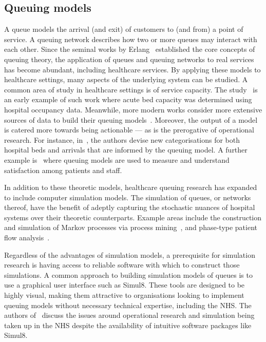 \subsection{Queuing models}\label{subsec:queuing}

A queue models the arrival (and exit) of customers to (and from) a point of
service. A queuing network describes how two or more queues may interact with
each other. Since the seminal works by Erlang~\cite{Erlang1917,Erlang1920}
established the core concepts of queuing theory, the application of queues and
queuing networks to real services has become abundant, including healthcare
services. By applying these models to healthcare settings, many aspects of the
underlying system can be studied. A common area of study in healthcare settings
is of service capacity. The study~\cite{McClain1976} is an early example of such
work where acute bed capacity was determined using hospital occupancy data.
Meanwhile, more modern works consider more extensive sources of data to build
their queuing models~\cite{Palvannan2012,Pinto2014,Williams2015}. Moreover, the
output of a model is catered more towards being actionable --- as is the
prerogative of operational research. For instance, in~\cite{Pinto2014}, the
authors devise new categorisations for both hospital beds and arrivals that are
informed by the queuing model. A further example is~\cite{Komashie2015} where
queuing models are used to measure and understand satisfaction among patients
and staff.

In addition to these theoretic models, healthcare queuing research has expanded
to include computer simulation models. The simulation of queues, or networks
thereof, have the benefit of adeptly capturing the stochastic nuances of
hospital systems over their theoretic counterparts. Example areas include the
construction and simulation of Markov processes via process
mining~\cite{Arnolds2018,Prokofyeva2020,Rebuge2012}, and phase-type patient
flow analysis~\cite{Bhattacharjee2014,McClean2011}.

Regardless of the advantages of simulation models, a prerequisite for simulation
research is having access to reliable software with which to construct those
simulations. A common approach to building simulation models of queues is to use
a graphical user interface such as Simul8. These tools are designed to be highly
visual, making them attractive to organisations looking to implement queuing
models without necessary technical expertise, including the NHS. The authors
of~\cite{Brailsford2013} discuss the issues around operational research and
simulation being taken up in the NHS despite the availability of intuitive
software packages like Simul8.

